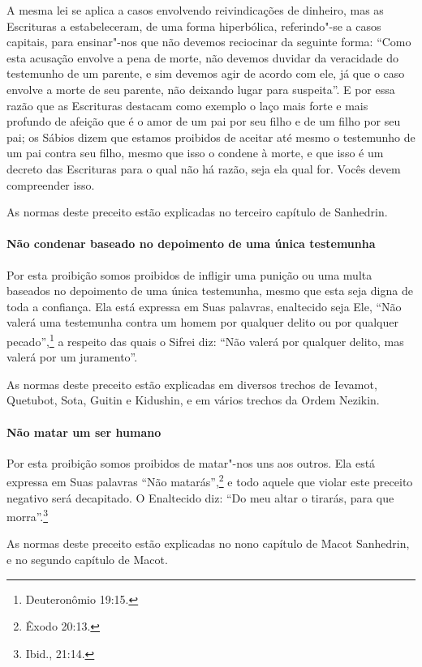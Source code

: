 \begin{multicols}{2}
A mesma lei se aplica a casos envolvendo reivindicações de dinheiro,
mas as Escrituras a estabeleceram, de uma forma hiperbólica,
referindo"-se a casos capitais, para ensinar"-nos que não devemos
reciocinar da seguinte forma: ``Como esta acusação envolve a pena de
morte, não devemos duvidar da veracidade do testemunho de um parente, e
sim devemos agir de acordo com ele, já que o caso envolve a morte de seu
parente, não deixando lugar para suspeita''. E por essa razão que as
Escrituras destacam como exemplo o laço mais forte e mais profundo de
afeição que é o amor de um pai por seu filho e de um filho por seu pai;
os Sábios dizem que estamos proibidos de aceitar até mesmo o testemunho
de um pai contra seu filho, mesmo que isso o condene à morte, e que isso
é um decreto das Escrituras para o qual não há razão, seja ela qual for.
Vocês devem compreender isso.

As normas deste preceito estão explicadas no terceiro capítulo de Sanhedrin\starr.

\paragraph{Não condenar baseado no depoimento de uma única testemunha}

Por esta proibição somos proibidos de infligir uma punição ou uma multa
baseados no depoimento de uma única testemunha, mesmo que esta seja
digna de toda a confiança. Ela está expressa em Suas palavras,
enaltecido seja Ele, ``Não valerá uma testemunha contra um homem por
qualquer delito ou por qualquer pecado'',\footnote{Deuteronômio 19:15.} a
respeito das quais o Sifrei\starr{} diz: ``Não valerá por qualquer delito, mas
valerá por um juramento''.

As normas deste preceito estão explicadas em diversos trechos de
Ievamot\starr, Quetubot\starr, Sota, Guitin\starr{} e Kidushin\starr, e em vários trechos da Ordem
Nezikin\starr.

\paragraph{Não matar um ser humano}

Por esta proibição somos proibidos de matar"-nos uns aos
outros. Ela está expressa em Suas palavras ``Não matarás'',\footnote{Êxodo
20:13.} e todo aquele que violar este preceito negativo será decapitado.
O Enaltecido diz: ``Do meu altar o tirarás, para que morra''.\footnote{Ibid., 21:14.}

As normas deste preceito estão explicadas no nono capítulo de Macot\starr{}
Sanhedrin\starr, e no segundo capítulo de Macot\starr.



\end{multicols}
